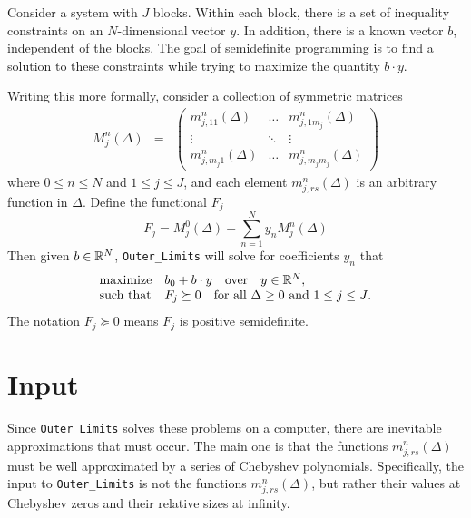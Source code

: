 \documentclass[12pt]{article}
\numberwithin{equation}{section}
\begin{document}
Consider a system with $J$ blocks.  Within each block, there is a set
of inequality constraints on an $N$-dimensional vector $y$.  In
addition, there is a known vector $b$, independent of the blocks.  The
goal of semidefinite programming is to find a solution to these
constraints while trying to maximize the quantity $b\cdot y$.

Writing this more formally, consider a collection of symmetric matrices
\begin{eqnarray}
\label{eq:sdp}
M_j^n(\Delta) &=& \begin{pmatrix}
m_{j,11}^{n}(\Delta) & \dots & m_{j,1m_j}^{n}(\Delta)\\
\vdots & \ddots & \vdots\\
m_{j,m_j1}^{n}(\Delta) & \dots & m^{n}_{j,m_jm_j}(\Delta)
\end{pmatrix}
\end{eqnarray}
where $0 \leq n \leq N$ and $1 \leq j \leq J$, and each element
$m_{j,rs}^{n}(\Delta)$ is an arbitrary function in $\Delta$.  Define the functional $F_j$
\begin{equation}
F_j=M^0_j(\Delta)+\sum_{n=1}^{N} y_n M^n_j(\Delta)
\end{equation}
Then given $b\in \mathbb{R}^N$, \texttt{Outer\_Limits} will solve for coefficients $y_n$
that
\begin{eqnarray}
\label{eq:SDPconstraints}
\begin{array}{ll}
\textrm{maximize} & b_0+b\cdot y\quad\textrm{over}\quad y \in \mathbb{R}^N,\\
\textrm{such that} & F_j \succeq 0 \quad \textrm{for all $\Delta\geq 0$ and $1 \leq j \leq J$}.
\end{array}
\end{eqnarray}
The notation $F_j\succeq 0$ means $F_j$ is positive semidefinite.

\section{Input}
\label{sec:input}

Since \texttt{Outer\_Limits} solves these problems on a computer,
there are inevitable approximations that must occur.  The main one is
that the functions $m_{j,rs}^{n}(\Delta)$ must be well approximated by
a series of Chebyshev polynomials.  Specifically, the input to
\texttt{Outer\_Limits} is not the functions $m_{j,rs}^{n}(\Delta)$,
but rather their values at Chebyshev zeros and their relative sizes at
infinity.
\end{document}
